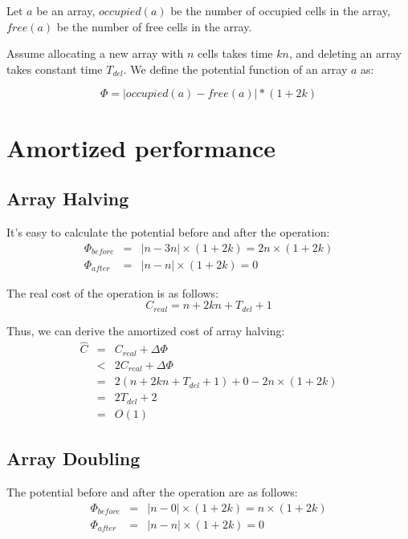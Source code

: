 Let $a$ be an array, $occupied(a)$ be the number of occupied cells in the array, $free(a)$ be the number of free cells in the array.

Assume allocating a new array with $n$ cells takes time $kn$, and deleting an array takes constant time $T_{del}$. We define the potential function of an array $a$ as:

\begin{equation}
\Phi = | occupied(a) - free(a) | * (1 + 2k)
\end{equation}

\section{Amortized performance}

  \subsection{Array Halving}
  It's easy to calculate the potential before and after the operation:
  \[
  \begin{array}{lcl}
    \Phi_{before} & = & | n - 3n | \times (1 + 2k) = 2n \times (1 + 2k) \\
    \Phi_{after} & = & | n - n | \times (1 + 2k) = 0
  \end{array}
  \]


  The real cost of the operation is as follows:
  \[
  C_{real} = n + 2kn + T_{del} + 1
  \]


  Thus, we can derive the amortized cost of array halving:
  \[
  \begin{array}{lcl}
  \hat C & = & C_{real} + \Delta \Phi \\
         & < & 2 C_{real} + \Delta \Phi \\
         & = & 2(n + 2kn + T_{del} + 1) + 0 - 2n \times (1 + 2k) \\
         & = & 2T_{del} + 2 \\
         & = & O(1)
  \end{array}
  \]

  \subsection{Array Doubling}
  The potential before and after the operation are as follows:
  \[
  \begin{array}{lcl}
    \Phi_{before} & = & | n - 0 | \times (1 + 2k) = n \times (1 + 2k) \\
    \Phi_{after} & = & | n - n | \times (1 + 2k) = 0
  \end{array}
  \]

